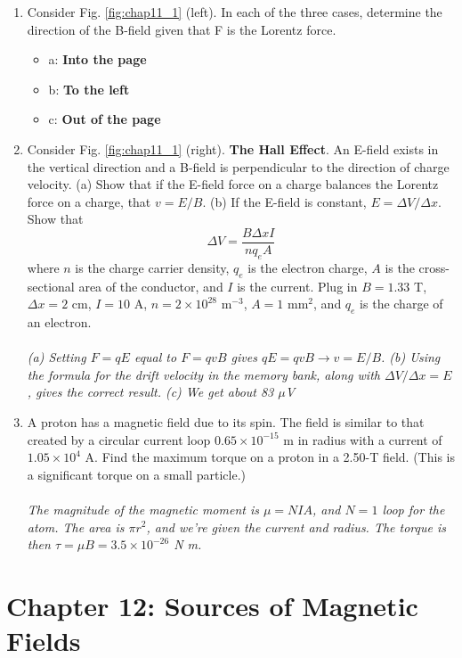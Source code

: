 \documentclass[10pt]{article}
\begin{document}
\begin{enumerate}
\item Consider Fig. \ref{fig:chap11_1} (left).  In each of the three cases, determine the direction of the B-field given that F is the Lorentz force.
\begin{itemize}
\item a: \textbf{Into the page}
\item b: \textbf{To the left}
\item c: \textbf{Out of the page}
\end{itemize}
\item Consider Fig. \ref{fig:chap11_1} (right).  \textbf{The Hall Effect}.  An E-field exists in the vertical direction and a B-field is perpendicular to the direction of charge velocity.  (a) Show that if the E-field force on a charge balances the Lorentz force on a charge, that $v = E/B$. (b) If the E-field is constant, $E = \Delta V/\Delta x$.  Show that
\begin{equation}
\Delta V = \frac{B\Delta x I}{n q_e A}
\end{equation}
where $n$ is the charge carrier density, $q_e$ is the electron charge, $A$ is the cross-sectional area of the conductor, and $I$ is the current.  Plug in $B = 1.33$ T, $\Delta x = 2$ cm, $I = 10$ A, $n = 2 \times 10^{28}$ m$^{-3}$, $A = 1$ mm$^2$, and $q_e$ is the charge of an electron. \\ \\
\textit{(a) Setting $F = qE$ equal to $F = qvB$ gives $qE = qvB \rightarrow v = E/B$.  (b) Using the formula for the drift velocity in the memory bank, along with $\Delta V/\Delta x = E$, gives the correct result.  (c) We get about 83 $\mu$V}
\item A proton has a magnetic field due to its spin. The field is similar to that created by a circular current loop $0.65 \times 10^{-15}$ m in radius with a current of $1.05 \times 10^{4}$ A.  Find the maximum torque on a proton in a 2.50-T field. (This is a significant torque on a small particle.) \\ \\
\textit{The magnitude of the magnetic moment is $\mu = NIA$, and $N = 1$ loop for the atom.  The area is $\pi r^2$, and we're given the current and radius.  The torque is then $\tau = \mu B = 3.5 \times 10^{-26}$ N m.}
\end{enumerate}

\section{Chapter 12: Sources of Magnetic Fields}
\end{document}
